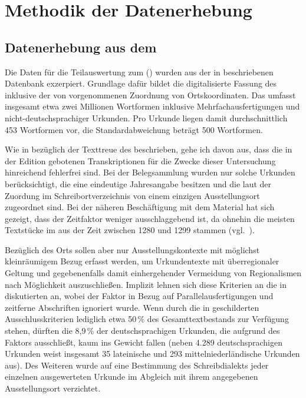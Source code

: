 \chapter{Methodik der Datenerhebung}
\label{ch:methoden}

\section%
	{Datenerhebung aus dem }
\label{sec:miningcao}

Die Daten für die Teilauswertung zum  (\CAO) wurden aus der in
\textcites[207]{beckerschallert2021}[155--158]{beckerschallert2022b}
beschriebenen Datenbank exzerpiert. Grundlage dafür bildet die digitalisierte
Fassung des \CAO{} \autocites{cao-online}[vgl.~dazu][]{gniffkerapp2005}
inklusive der von \citeauthor{beckerschallert2022b} vorgenommenen Zuordnung von
Ortskoordinaten. Das \CAO{} umfasst insgesamt etwa zwei Millionen Wortformen
inklusive Mehrfachausfertigungen und nicht-deutschsprachiger Urkunden. Pro
Urkunde liegen damit durchschnittlich 453 Wortformen vor, die
Standardabweichung beträgt 500 Wortformen.

Wie in  bezüglich der Text\-treue des \CAO{} beschrieben,
gehe ich davon aus, dass die in der Edition gebotenen Transkriptionen für die
Zwecke dieser Untersuchung hinreichend fehlerfrei sind. Bei der Belegsammlung
wurden nur solche Urkunden berücksichtigt, die eine eindeutige Jahresangabe
besitzen und die laut der Zuordung im Schreibortverzeichnis von
\citet{cao-online} einem einzigen Ausstellungsort zugeordnet sind. Bei der
näheren Beschäftigung mit dem Material hat sich gezeigt, dass der Zeitfaktor
weniger ausschlaggebend ist, da ohnehin die meisten Textstücke im \CAO{} aus
der Zeit zwischen 1280 und 1299 stammen (vgl.~).

Bezüglich des Orts sollen aber nur Ausstellungs\-kontexte mit möglichst
kleinräumigem Bezug erfasst werden, um Urkundentexte mit überregionaler Geltung
und gegebenenfalls damit einhergehender Vermeidung von Regionalismen nach
Möglichkeit auszuschließen. Implizit lehnen sich diese Kriterien an die in
\citet[41--42]{ganslmayer2012} diskutierten an, wobei der Faktor  in
Bezug auf Parallelausfertigungen und zeitferne Abschriften ignoriert wurde.
Wenn durch die in \citet[155--158]{beckerschallert2022b} geschilderten
Ausschlusskriterien lediglich etwa 50\,\% des Gesamttextbestands zur Verfügung
stehen, dürften die 8,9\,\% der deutschsprachigen Urkunden, die
\citeauthor{ganslmayer2012} aufgrund des Faktors  ausschließt, kaum ins
Gewicht fallen (neben 4.289 deutschsprachigen Urkunden weist
\citet[41]{ganslmayer2012} insgesamt 35 lateinische und 293
mittelniederländische Urkunden aus). Des Weiteren
wurde auf eine Bestimmung des Schreibdialekts jeder einzelnen ausgewerteten
Urkunde im Abgleich mit ihrem angegebenen Ausstellungsort verzichtet.

